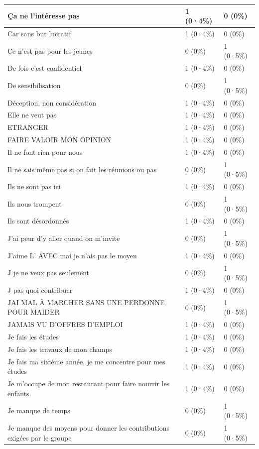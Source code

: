 \documentclass[
]{book}
\begin{document}
\begin{tabular}{l|l|l}
Ça ne l'intéresse pas & 1 (0·4\%) & 0 (0\%)\\
\hline
Car sans but lucratif & 1 (0·4\%) & 0 (0\%)\\
\hline
Ce n'est pas pour les jeunes & 0 (0\%) & 1 (0·5\%)\\
\hline
De fois c'est confidentiel & 1 (0·4\%) & 0 (0\%)\\
\hline
De sensibilisation & 0 (0\%) & 1 (0·5\%)\\
\hline
Déception, non considération & 1 (0·4\%) & 0 (0\%)\\
\hline
Elle ne veut pas & 1 (0·4\%) & 0 (0\%)\\
\hline
ETRANGER & 1 (0·4\%) & 0 (0\%)\\
\hline
FAIRE VALOIR MON OPINION & 1 (0·4\%) & 0 (0\%)\\
\hline
Il ne font rien pour nous & 1 (0·4\%) & 0 (0\%)\\
\hline
Il ne sais même pas si on fait les réunions ou pas & 0 (0\%) & 1 (0·5\%)\\
\hline
Ils ne sont pas ici & 1 (0·4\%) & 0 (0\%)\\
\hline
Ils nous trompent & 0 (0\%) & 1 (0·5\%)\\
\hline
Ils sont désordonnés & 1 (0·4\%) & 0 (0\%)\\
\hline
J'ai peur d'y aller quand on m'invite & 0 (0\%) & 1 (0·5\%)\\
\hline
J'aime L' AVEC mai je n'ais pas le moyen & 1 (0·4\%) & 0 (0\%)\\
\hline
J je ne veux pas seulement & 0 (0\%) & 1 (0·5\%)\\
\hline
J pas quoi contribuer & 1 (0·4\%) & 0 (0\%)\\
\hline
JAI MAL À MARCHER SANS UNE PERDONNE POUR MAIDER & 0 (0\%) & 1 (0·5\%)\\
\hline
JAMAIS VU D'OFFRES D'EMPLOI & 1 (0·4\%) & 0 (0\%)\\
\hline
Je fais les études & 1 (0·4\%) & 0 (0\%)\\
\hline
Je fais les travaux de mon champs & 1 (0·4\%) & 0 (0\%)\\
\hline
Je fais ma sixième année, je me concentre pour mes études & 1 (0·4\%) & 0 (0\%)\\
\hline
Je m'occupe de mon restaurant pour faire nourrir les enfants. & 1 (0·4\%) & 0 (0\%)\\
\hline
Je manque de temps & 0 (0\%) & 1 (0·5\%)\\
\hline
Je manque des moyens pour donner les contributions exigées par le groupe & 0 (0\%) & 1 (0·5\%)\\

\end{tabular}
\end{document}
